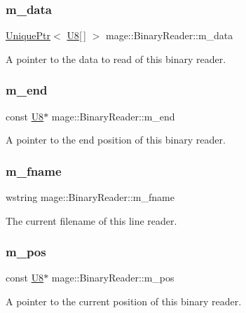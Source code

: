 \subsubsection{\texorpdfstring{m\+\_\+data}{m\_data}}
{\footnotesize\ttfamily \hyperlink{namespacemage_a3316d7143a973e37adf1110f2e80ca31}{Unique\+Ptr}$<$ \hyperlink{namespacemage_afc638980bc6154f15af5e2d93a0e0ea9}{U8}\mbox{[}$\,$\mbox{]} $>$ mage\+::\+Binary\+Reader\+::m\+\_\+data\hspace{0.3cm}{\ttfamily [private]}}

A pointer to the data to read of this binary reader. \hypertarget{classmage_1_1_binary_reader_a19b0f36cb1e8a05aaa9471514242e8ef}{}\label{classmage_1_1_binary_reader_a19b0f36cb1e8a05aaa9471514242e8ef} 
\subsubsection{\texorpdfstring{m\+\_\+end}{m\_end}}
{\footnotesize\ttfamily const \hyperlink{namespacemage_afc638980bc6154f15af5e2d93a0e0ea9}{U8}$\ast$ mage\+::\+Binary\+Reader\+::m\+\_\+end\hspace{0.3cm}{\ttfamily [private]}}

A pointer to the end position of this binary reader. \hypertarget{classmage_1_1_binary_reader_a9c97c02d53ce60a9952751ad4f55414f}{}\label{classmage_1_1_binary_reader_a9c97c02d53ce60a9952751ad4f55414f} 
\subsubsection{\texorpdfstring{m\+\_\+fname}{m\_fname}}
{\footnotesize\ttfamily wstring mage\+::\+Binary\+Reader\+::m\+\_\+fname\hspace{0.3cm}{\ttfamily [private]}}

The current filename of this line reader. \hypertarget{classmage_1_1_binary_reader_aedb9632de1cf95d5af49499217744ed5}{}\label{classmage_1_1_binary_reader_aedb9632de1cf95d5af49499217744ed5} 
\subsubsection{\texorpdfstring{m\+\_\+pos}{m\_pos}}
{\footnotesize\ttfamily const \hyperlink{namespacemage_afc638980bc6154f15af5e2d93a0e0ea9}{U8}$\ast$ mage\+::\+Binary\+Reader\+::m\+\_\+pos\hspace{0.3cm}{\ttfamily [private]}}

A pointer to the current position of this binary reader. 
